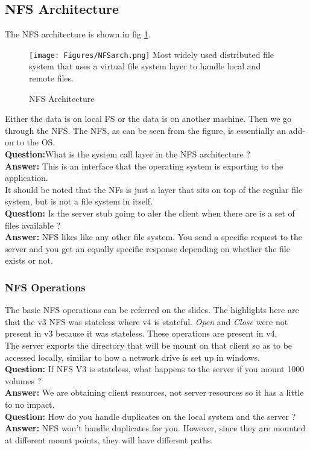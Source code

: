 \documentclass[twoside]{article}
\begin{document}
\subsection{NFS Architecture}

The NFS architecture is shown in fig \ref{nfs}.
\begin{figure}[htbp]
\centering
\texttt{[image: Figures/NFSarch.png]}
Most widely used distributed file system that uses a virtual file system layer to handle local and remote files. 
\caption{NFS Architecture} \label{nfs}
\end{figure}

Either the data is on local FS or the data is on another machine. Then we go through the NFS. The NFS, as can be seen from the figure, is essentially an add-on to the OS. \\
\textbf{Question:}What is the system call layer in the NFS architecture ?\\
\textbf{Answer:} This is an interface that the operating system is exporting to the application. \\ 
It should be noted that the NFs is just a layer that sits on top of the regular file system, but is not a file system in itself.\\
\textbf{Question:} Is the server stub going to aler the client when there are is a set of files available ? \\ 
\textbf{Answer:} NFS likes like any other file system. You send a specific request to the server and you get an equally specific response depending on whether the file exists or not.\\ 

\subsubsection{NFS Operations}
The basic NFS operations can be referred on the slides. The highlights here are that the v3 NFS was stateless where v4 is stateful. \emph{Open} and \emph{Close} were not present in v3 because it was stateless. These operations are present in v4. \\ 
The server exports the directory that will be mount on that client so as to be accessed locally, similar to how a network drive is set up in windows. \\
\textbf{Question: } If NFS V3 is stateless, what happens to the server if you mount 1000 volumes ? \\ 
\textbf{Answer:} We are obtaining client resources, not server resources so it has a little to no impact. \\ 
\textbf{Question:} How do you handle duplicates on the local system and the server ?\\
\textbf{Answer:} NFS won't handle duplicates for you. However, since they are mounted at different mount points, they will have different paths. \\
\end{document}
